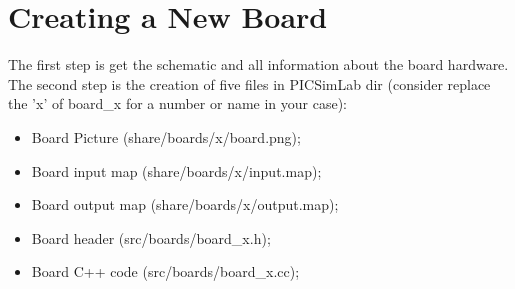 % 
% 
% 
% 
% 
% 
% 
% 
% 
% 

\section{Creating a New Board}

The first step is get the schematic and all information about the board hardware.
The second step is the creation of five files in PICSimLab dir (consider replace the 'x' of board\_x for a number or name in your case):
\begin{itemize}
\item Board Picture (share/boards/x/board.png);
\item Board input map (share/boards/x/input.map);
\item Board output map (share/boards/x/output.map);
\item Board header (src/boards/board\_x.h);
\item Board C++ code (src/boards/board\_x.cc);
\end{itemize}

